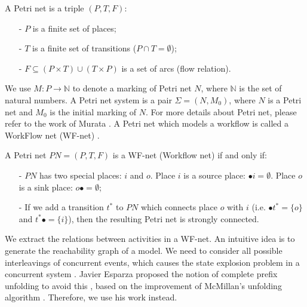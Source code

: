 \documentclass{llncs}
\begin{document}
\begin{definition}\label{def:petrinet}
A Petri net is a triple $(P,T,F)$:
	\begin{itemize}
		\item[-] $P$ is a finite set of places;
		\item[-] $T$ is a finite set of transitions ($P\cap T=\emptyset$);
		\item[-] $F\subseteq(P\times T)\cup(T\times P)$ is a set of arcs (flow relation).
	\end{itemize}
\end{definition}

We use $M:P\rightarrow\mathbb{N}$ to denote a marking of Petri net $N$, where $\mathbb{N}$ is the set of natural numbers. A Petri net system is a pair $\Sigma=(N,M_{0})$, where $N$ is a Petri net and $M_{0}$ is the initial marking of $N$. For more details about Petri net, please refer to the work of Murata \cite{murata1989petri}. A Petri net which models a workflow is called a WorkFlow net (WF-net) \cite{van1998application}.

\begin{definition}[WF-net]\label{def:wfnet}
A Petri net $PN=(P,T,F)$ is a WF-net (Workflow net) if and only if:
	\begin{itemize}
		\item[-] $PN$ has two special places: $i$ and $o$. Place $i$ is a source place: $\bullet i=\emptyset$. Place $o$ is a sink place: $o\bullet =\emptyset$;
		\item[-] If we add a transition $t^{*}$ to $PN$ which connects place $o$ with $i$ (i.e. $\bullet t^{*}=\{o\}$ and $t^{*}\bullet=\{i\}$), then the resulting Petri net is strongly connected.
	\end{itemize}
\end{definition}

We extract the relations between activities in a WF-net. An intuitive idea is to generate the reachability graph of a model. We need to consider all possible interleavings of concurrent events, which causes the state explosion problem in a concurrent system \cite{mcmillan1995technique}. Javier Esparza proposed the notion of complete prefix unfolding to avoid this \cite{esparza1996improvement}, based on the improvement of McMillan's unfolding algorithm \cite{mcmillan1995technique}. Therefore, we use his work instead.
\end{document}
